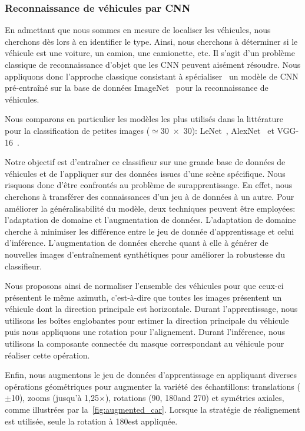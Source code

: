 \subsubsection{Reconnaissance de véhicules par \gls{CNN}}

En admettant que nous sommes en mesure de localiser les véhicules, nous cherchons dès lors à en identifier le type. Ainsi, nous cherchons à déterminer si le véhicule est une voiture, un camion, une camionette, etc. Il s'agit d'un problème classique de reconnaissance d'objet que les \gls{CNN} peuvent aisément résoudre. Nous appliquons donc l'approche classique consistant à spécialiser~\cite{nogueira_towards_2016,zhou_deep_2016} un modèle de \gls{CNN} pré-entraîné sur la base de données ImageNet~\cite{russakovsky_imagenet_2015} pour la reconnaissance de véhicules.

Nous comparons en particulier les modèles les plus utilisés dans la littérature pour la classification de petites images ($\simeq$\SI{30x30}{\px}): LeNet~\cite{lecun_gradient-based_1998}, AlexNet~\cite{krizhevsky_imagenet_2012} et VGG-16~\cite{simonyan_very_2014}.

Notre objectif est d'entraîner ce classifieur sur une grande base de données de véhicules et de l'appliquer sur des données issues d'une scène spécifique. Nous risquons donc d'être confrontés au problème de surapprentissage. En effet, nous cherchons à transférer des connaissances d'un jeu à de données à un autre. Pour améliorer la généralisabilité du modèle, deux techniques peuvent être employées: l'adaptation de domaine et l'augmentation de données. L'adaptation de domaine cherche à minimiser les différence entre le jeu de donnée d'apprentissage et celui d'inférence. L'augmentation de données cherche quant à elle à générer de nouvelles images d'entraînement synthétiques pour améliorer la robustesse du classifieur.

Nous proposons ainsi de normaliser l'ensemble des véhicules pour que ceux-ci présentent le même azimuth, c'est-à-dire que toutes les images présentent un véhicule dont la direction principale est horizontale. Durant l'apprentissage, nous utilisons les boîtes englobantes pour estimer la direction principale du véhicule puis nous appliquons une rotation pour l'alignement. Durant l'inférence, nous utilisons la composante connectée du masque correspondant au véhicule pour réaliser cette opération.

Enfin, nous augmentons le jeu de données d'apprentissage en appliquant diverses opérations géométriques pour augmenter la variété des échantillons: translations ($\pm$\SI{10}{\px}), zooms (jusqu'à 1,25$\times$), rotations (90\degre, 180\degre and 270\degre) et symétries axiales, comme illustrées par la~\cref{fig:augmented_car}. Lorsque la stratégie de réalignement est utilisée, seule la rotation à 180\degre est appliquée.

